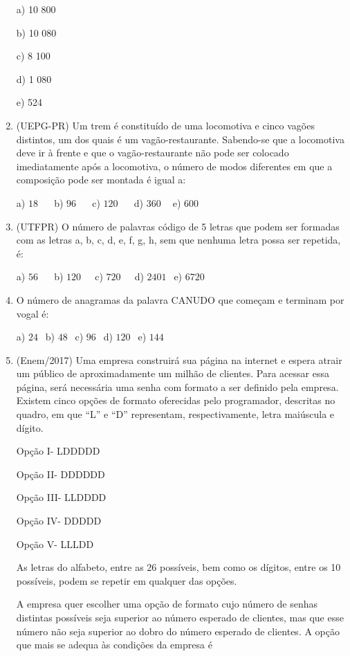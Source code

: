 \begin{multicols*}{2}
\begin{enumerate}
a) 10 800 

b) 10 080 

c) 8 100 

d) 1 080 

e) 524

		\item (UEPG-PR) Um trem é constituído de uma locomotiva e cinco vagões distintos, um dos quais é um vagão-restaurante. Sabendo-se que a locomotiva deve ir à frente e que o vagão-restaurante não pode ser colocado imediatamente após a locomotiva, o número de modos diferentes em que a composição pode ser montada é igual a: 

		a) $18 \ \ \ \ \ \ $ b) $96 \ \ \ \ \ \ $ c) $120 \ \ \ \ \ \ $ d) $360 \ \ \ \ $ e) $600 \ \ $

		\item (UTFPR) O número de palavras código de 5 letras que podem ser formadas com as letras a, b, c, d, e, f, g, h, sem que nenhuma letra possa ser repetida, é: 
		
		a) $56 \ \ \ \ \ \ $ b) $120 \ \ \ \ \ $ c) $720 \ \ \ \ \ $ d) $2401 \ \ $ e) $6720 $

		\item O número de anagramas da palavra CANUDO que começam e terminam por vogal é: 

		a) $24 \ \ $ b) $48 \ \ $ c) $96 \ \ $ d) $120 \ \ $ e) $144 \ \ $		

		\item (Enem/2017) Uma empresa construirá sua página na internet e espera atrair um público de aproximadamente um milhão de clientes. Para acessar essa página, será necessária uma senha com formato a ser definido pela empresa. Existem cinco opções de formato oferecidas pelo programador, descritas no quadro, em que “L” e “D” representam, respectivamente, letra maiúscula e dígito.
		
Opção I- LDDDDD

Opção II- DDDDDD

Opção III- LLDDDD

Opção IV- DDDDD

Opção V- LLLDD

As letras do alfabeto, entre as 26 possíveis, bem como os dígitos, entre os 10 possíveis, podem se repetir em qualquer das opções.

A empresa quer escolher uma opção de formato cujo número de senhas distintas possíveis seja superior ao número esperado de clientes, mas que esse número não seja superior ao dobro do número esperado de clientes.
A opção que mais se adequa às condições da empresa é


\end{enumerate}
\end{multicols*}

